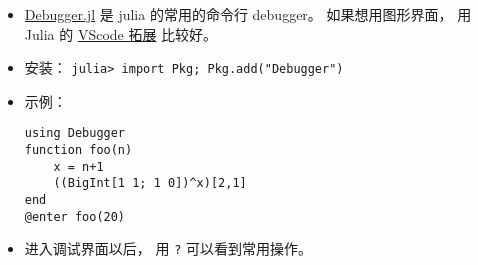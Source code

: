 
\begin{issues}
\issueDraft
\end{issues}

\begin{itemize}
\item \href{https://github.com/JuliaDebug/Debugger.jl}{Debugger.jl} 是 julia 的常用的命令行 debugger。 如果想用图形界面， 用 Julia 的 \href{https://www.julia-vscode.org}{VScode 拓展} 比较好。
\item 安装： \verb|julia> import Pkg; Pkg.add("Debugger")|
\item 示例：
\begin{lstlisting}[language=none]
using Debugger
function foo(n)
    x = n+1
    ((BigInt[1 1; 1 0])^x)[2,1]
end
@enter foo(20)
\end{lstlisting}
\item 进入调试界面以后， 用 \verb|?| 可以看到常用操作。
\end{itemize}
